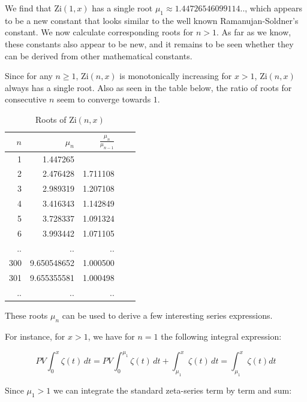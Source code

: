 \documentclass[a4paper,11pt,twoside]{amsart}
\newcommand\Zi{\mathrm{Zi}}
\begin{document}
We find that $\Zi(1,x)$ has a single root $\mu_1 \approx 1.44726546099114$.., which appears to be a new constant that looks similar to the well known Ramanujan-Soldner's constant. We now calculate corresponding roots for $n>1$. As far as we know, these constants also appear to be new, and it remains to be seen whether they can be derived from other mathematical constants. 

Since for any $n \ge 1$, $\Zi(n,x)$ is monotonically increasing for $x>1$, $\Zi(n,x)$ always has a single root. Also as seen in the table below, the ratio of roots for consecutive $n$ seem to converge towards $1$. 

\begin{table}[H]
  \begin{center}
    \caption{Roots of $\Zi(n,x)$}
    \label{tab:table2}
    \begin{tabular}{r|r|r|r|r} %
      $n$ & $\mu_{n}$ & $\frac{\mu_{n}}{\mu_{n-1}}$\\
      \hline
      1 & 1.447265 & \\
      2 & 2.476428 & 1.711108\\
      3 & 2.989319 & 1.207108\\
      4 & 3.416343 & 1.142849\\
      5 & 3.728337 & 1.091324\\
      6 & 3.993442 & 1.071105\\
      .. & .. & ..\\
      300 & 9.650548652 & 1.000500\\
      301 & 9.655355581 & 1.000498\\
      .. & .. & ..\\
    \end{tabular}
  \end{center}
\end{table}

These roots $\mu_{n}$ can be used to derive a few interesting series expressions. 

For instance, for $x > 1$, we have for $n = 1$ the following integral expression:

\begin{equation}\label{zetPV1}
 PV \int_0^x \zeta(t)\, dt = PV \int_0^{\mu_1} \zeta(t)\, dt + \int_{\mu_1}^{x} \zeta(t)\, dt = \int_{\mu_1}^{x} \zeta(t) dt
\end{equation}

Since $\mu_1 > 1$ we can integrate the standard zeta-series term by term and sum:
\end{document}
